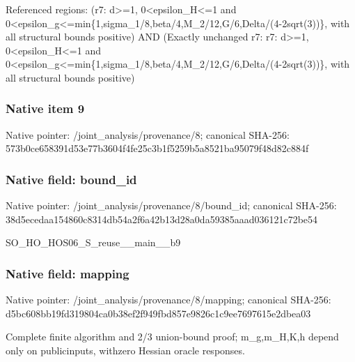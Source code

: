 \documentclass[10pt,a4paper]{article}
\begin{document}
\begingroup\raggedright\sloppy Referenced regions:\allowbreak{} (r7:\allowbreak{} d>=\allowbreak{}1,\allowbreak{} 0<epsilon\_\allowbreak{}H<=\allowbreak{}1 and 0<epsilon\_\allowbreak{}g<=\allowbreak{}min\{1,\allowbreak{}sigma\_\allowbreak{}1/\allowbreak{}8,\allowbreak{}beta/\allowbreak{}4,\allowbreak{}M\_\allowbreak{}2/\allowbreak{}12,\allowbreak{}G/\allowbreak{}6,\allowbreak{}Delta/\allowbreak{}(4-2sqrt(3))\},\allowbreak{} with all structural bounds positive) AND (Exactly unchanged r7:\allowbreak{} r7:\allowbreak{} d>=\allowbreak{}1,\allowbreak{} 0<epsilon\_\allowbreak{}H<=\allowbreak{}1 and 0<epsilon\_\allowbreak{}g<=\allowbreak{}min\{1,\allowbreak{}sigma\_\allowbreak{}1/\allowbreak{}8,\allowbreak{}beta/\allowbreak{}4,\allowbreak{}M\_\allowbreak{}2/\allowbreak{}12,\allowbreak{}G/\allowbreak{}6,\allowbreak{}Delta/\allowbreak{}(4-2sqrt(3))\},\allowbreak{} with all structural bounds positive)\par\endgroup

\subsubsection{Native item 9}
Native pointer: /joint\_\allowbreak{}analysis/provenance/8; canonical SHA-256: 573b0ce658391d53e77b3604f4fe25c3b1f5259b5a8521ba95079f48d82c884f

\subsubsection{Native field: bound\_\allowbreak{}id}
Native pointer: /joint\_\allowbreak{}analysis/provenance/8/bound\_\allowbreak{}id; canonical SHA-256: 38d5ecedaa154860c8314db54a2f6a42b13d28a0da59385aaad036121c72be54

\begingroup\raggedright\sloppy SO\_\allowbreak{}HO\_\allowbreak{}HOS06\_\allowbreak{}S\_\allowbreak{}reuse\_\allowbreak{}\_\allowbreak{}main\_\allowbreak{}\_\allowbreak{}b9\par\endgroup

\subsubsection{Native field: mapping}
Native pointer: /joint\_\allowbreak{}analysis/provenance/8/mapping; canonical SHA-256: d5bc608bb19fd319804ca0b38ef2f949fbd857e9826c1c9ee7697615e2dbea03

\begingroup\raggedright\sloppy Complete finite algorithm and 2/\allowbreak{}3 union-bound proof;\allowbreak{} m\_\allowbreak{}g,\allowbreak{}m\_\allowbreak{}H,\allowbreak{}K,\allowbreak{}h depend only on publicinputs,\allowbreak{} withzero Hessian oracle responses.\par\endgroup
\end{document}
